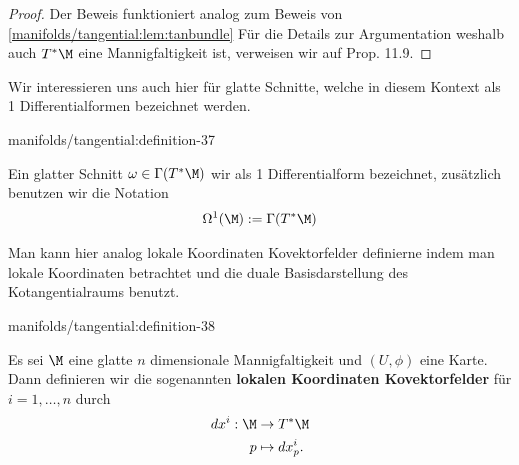 \documentclass[letterpaper,10pt,german]{jupyterBook}
\begin{document}
\begin{proof}
 Der Beweis funktioniert analog zum Beweis von \cref{manifolds/tangential:lem:tanbundle}  Für die Details zur Argumentation weshalb auch \(T^\ast\M\) eine Mannigfaltigkeit ist, verweisen wir auf \cite{Lee03} Prop. 11.9.
\end{proof}

\par
Wir interessieren uns auch hier für glatte Schnitte, welche in diesem Kontext als 1 Differentialformen bezeichnet werden.
\begin{definition}{}{manifolds/tangential:definition-37}



\par
Ein glatter Schnitt \(\omega\in\Gamma(T^\ast\M)\) wir als 1 Differentialform bezeichnet, zusätzlich benutzen wir die Notation
\begin{align*}
\Omega^1(\M) := \Gamma(T^\ast\M)
\end{align*}\end{definition}

\par
Man kann hier analog lokale Koordinaten Kovektorfelder definierne indem man lokale Koordinaten betrachtet und die duale Basisdarstellung des Kotangentialraums benutzt.
\begin{definition}{}{manifolds/tangential:definition-38}



\par
Es sei \(\M\) eine glatte \(n\) dimensionale Mannigfaltigkeit und \((U,\phi)\) eine Karte.
Dann definieren wir die sogenannten \textbf{lokalen Koordinaten Kovektorfelder} für \(i=1,\ldots,n\) durch
\begin{align*}
dx^{i}:\M&\to T^\ast\M\\
p&\mapsto dx^{i}_p.\end{align*}\end{definition}
\end{document}
